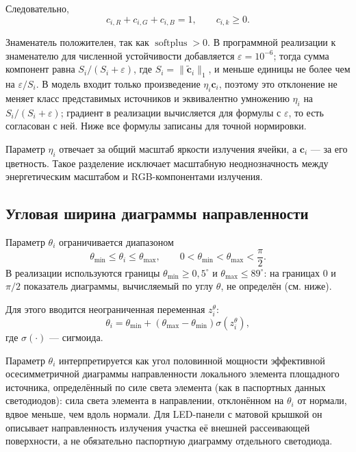 Следовательно,
\begin{equation}
c_{i,R}+c_{i,G}+c_{i,B}= 1,
\qquad
c_{i,k}\geq 0.
\end{equation}

Знаменатель положителен, так как $\operatorname{softplus}>0$. В программной реализации к знаменателю для численной устойчивости добавляется $\varepsilon=10^{-6}$; тогда сумма компонент равна $S_i/(S_i+\varepsilon)$, где $S_i=\|\tilde{\mathbf{c}}_i\|_1$, и меньше единицы не более чем на $\varepsilon/S_i$. В модель входит только произведение $\eta_i\mathbf{c}_i$, поэтому это отклонение не меняет класс представимых источников и эквивалентно умножению $\eta_i$ на $S_i/(S_i+\varepsilon)$; градиент в реализации вычисляется для формулы с $\varepsilon$, то есть согласован с ней. Ниже все формулы записаны для точной нормировки.

Параметр $\eta_i$ отвечает за общий масштаб яркости излучения ячейки, а $\mathbf{c}_i$ --- за его цветность. Такое разделение исключает масштабную неоднозначность между энергетическим масштабом и RGB-компонентами излучения.

\subsection{Угловая ширина диаграммы направленности}

Параметр $\theta_i$ ограничивается диапазоном
\begin{equation}
\theta_{\min}
\leq
\theta_i
\leq
\theta_{\max},
\qquad
0<\theta_{\min}<\theta_{\max}<\frac{\pi}{2}.
\end{equation}
В реализации используются границы $\theta_{\min}\geq0,5^\circ$ и $\theta_{\max}\leq89^\circ$: на границах $0$ и $\pi/2$ показатель диаграммы, вычисляемый по углу $\theta$, не определён (см. ниже).

Для этого вводится неограниченная переменная $z_i^\theta$:
\begin{equation}
\theta_i
=
\theta_{\min}
+
\left(\theta_{\max}-\theta_{\min}\right)
\sigma(z_i^\theta),
\end{equation}
где $\sigma(\cdot)$ --- сигмоида.

Параметр $\theta_i$ интерпретируется как угол половинной мощности эффективной осесимметричной диаграммы направленности локального элемента площадного источника, определённый по силе света элемента (как в паспортных данных светодиодов): сила света элемента в направлении, отклонённом на $\theta_i$ от нормали, вдвое меньше, чем вдоль нормали. Для LED-панели с матовой крышкой он описывает направленность излучения участка её внешней рассеивающей поверхности, а не обязательно паспортную диаграмму отдельного светодиода.


